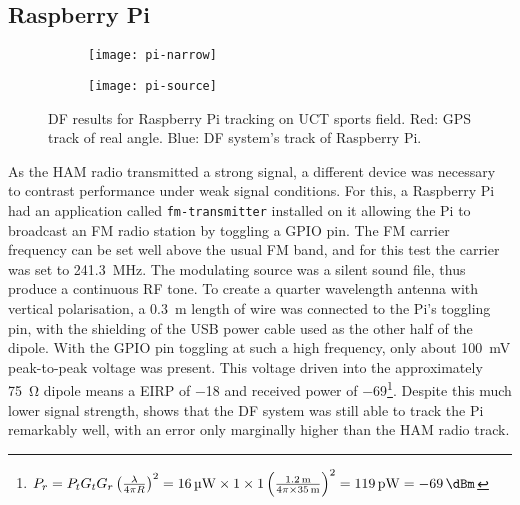\subsection{Raspberry Pi}
\begin{figure}
  \centering
  \begin{subfigure}[b]{0.77\textwidth}
    \centering
    \texttt{[image: pi-narrow]}
  \end{subfigure}
  \begin{subfigure}[b]{0.22\textwidth}
    \centering
    \texttt{[image: pi-source]}
    \vspace{2em}
  \end{subfigure}
  \caption{DF results for Raspberry Pi tracking on UCT sports field. Red: GPS track of real angle. Blue: DF system's track of Raspberry Pi.}
  \label{fig:field-trials:pi-source}
\end{figure}
As the HAM radio transmitted a strong signal, a different device was necessary to contrast performance under weak signal conditions. For this, a Raspberry Pi had an application called \lstinline{fm-transmitter} installed on it allowing the Pi to broadcast an FM radio station by toggling a GPIO pin. The FM carrier frequency can be set well above the usual FM band, and for this test the carrier was set to \SI{241.3}{\mega\hertz}. The modulating source was a silent sound file, thus produce a continuous RF tone. To create a quarter wavelength antenna with vertical polarisation, a \SI{0.3}{\metre} length of wire was connected to the Pi's toggling pin, with the shielding of the USB power cable used as the other half of the dipole.
With the GPIO pin toggling at such a high frequency, only about \SI{100}{\milli\volt} peak-to-peak voltage was present. This voltage driven into the approximately \SI{75}{\ohm} dipole means a EIRP of \SI{-18}{\dBm} and received power of \SI{-69}{\dBm}\footnote{\(P_r = P_t G_t G_r \left( \frac{\lambda}{4 \pi R} \right)^2 = \SI{16}{\micro\watt} \times 1 \times 1 \left( \frac{\SI{1.2}{\meter}}{4 \pi \times \SI{35}{\meter}} \right)^2 = \SI{119}{\pico\watt} = \SI{-69}{\dBm}\)}. Despite this much lower signal strength,  shows that the DF system was still able to track the Pi remarkably well, with an error only marginally higher than the HAM radio track.

